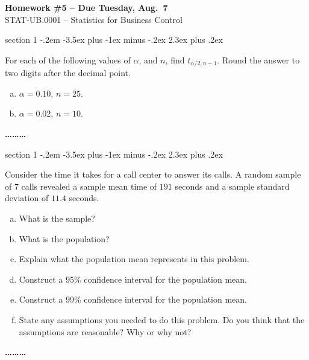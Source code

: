 \documentclass[11pt]{exam}
\makeatletter
\newenvironment{problem}{\@startsection
       {section}
       {1}
       {-.2em}
       {-3.5ex plus -1ex minus -.2ex}
       {2.3ex plus .2ex}
       {\pagebreak[3]%
       \large\bf\noindent{Problem }
       }
       }
       {%
       \begin{center}\large\bf \ldots\ldots\ldots\end{center}}
\makeatother
\begin{document}
\begin{center}
  \large
  \textbf{Homework \#5 -- Due Tuesday, Aug.~7} \\
  STAT-UB.0001 -- Statistics for Business Control \\
\end{center}


\thispagestyle{empty}

\begin{problem}{}

For each of the following values of $\alpha$, and $n$, find $t_{\alpha/2,n-1}$. 
Round the answer to two digits after the decimal point.

\begin{enumerate}[(a)]

\item $\alpha = 0.10$, $n = 25$.

\item $\alpha = 0.02$, $n = 10$.

\end{enumerate}

\end{problem}

\begin{problem}{}

Consider the time it takes for a call center to answer its calls. A random
sample of $7$ calls revealed a sample mean time of $191$ seconds and a sample
standard deviation of $11.4$ seconds.

\begin{enumerate}[(a)]

\item What is the sample?

\item What is the population?

\item Explain what the population mean represents in this problem.

\item Construct a 95\% confidence interval for the population mean.

\item Construct a 99\% confidence interval for the population mean.

\item State any assumptions you needed to do this problem. Do you think that
the assumptions are reasonable? Why or why not?

\end{enumerate}

\end{problem}
\end{document}

